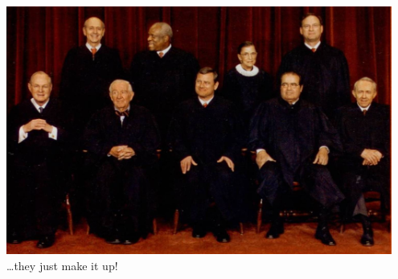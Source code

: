 
\begin{frame}
    \centering
    \includegraphics[width=0.95\textwidth]{img/thomas-breyer.jpg} \\
    \pause
    { \large \ldots they just make it up! } \\
\end{frame}

